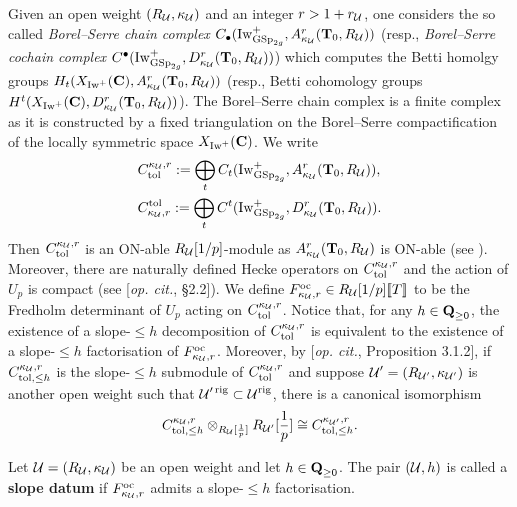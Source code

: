 Given an open weight $(R_{\calU}, \kappa_{\calU})$ and an integer $r>1+r_{\calU}$, one considers the so called \emph{Borel--Serre chain complex} $C_{\bullet}(\Iw_{\GSp_{2g}}^+, A_{\kappa_{\calU}}^{r}(\T_0, R_{\calU}))$ (resp., \emph{Borel--Serre cochain complex} $C^{\bullet}(\Iw_{\GSp_{2g}}^+, D_{\kappa_{\calU}}^{r}(\T_0, R_{\calU}))$) which computes the Betti homolgy groups $H_t(X_{\Iw^+}(\C), A_{\kappa_{\calU}}^r(\T_0, R_{\calU}))$ (resp., Betti cohomology groups $H^t(X_{\Iw^+}(\C), D_{\kappa_{\calU}}^r(\T_0, R_{\calU}))$). The Borel--Serre chain complex is a finite complex as it is constructed by a fixed triangulation on the Borel--Serre compactification of the locally symmetric space $X_{\Iw^+}(\C)$. We write \begin{align*}
    & C_{\tol}^{\kappa_{\calU}, r} := \bigoplus_{t}C_t(\Iw^+_{\GSp_{2g}}, A_{\kappa_{\calU}}^r(\T_0, R_{\calU})),\\
    & C_{\kappa_{\calU}, r}^{\tol} := \bigoplus_{t}C^t(\Iw_{\GSp_{2g}}^+, D_{\kappa_{\calU}}^r(\T_0, R_{\calU})).
\end{align*} Then $C^{\kappa_{\calU}, r}_{\tol}$ is an ON-able $R_{\calU}[1/p]$-module as $A_{\kappa_{\calU}}^r(\T_0, R_{\calU})$ is ON-able (see \cite[\S 2.2, Remarks]{Hansen-PhD}). Moreover, there are naturally defined Hecke operators on $C_{\tol}^{\kappa_{\calU}, r}$ and the action of $U_p$ is compact (see [\textit{op. cit.}, \S 2.2]). We define $F_{\kappa_{\calU}, r}^{\oc}\in R_{\calU}[1/p]\llbrack T\rrbrack$ to be the Fredholm determinant of $U_p$ acting on $C^{\kappa_{\calU}, r}_{\tol}$. Notice that, for any $h\in \Q_{\geq 0}$, the existence of a slope-$\leq h$ decomposition of $C_{\tol}^{\kappa_{\calU}, r}$ is equivalent to the existence of a slope-$\leq h$ factorisation of $F_{\kappa_{\calU},r}^{\oc}$. Moreover, by [\textit{op. cit.}, Proposition 3.1.2], if $C^{\kappa_{\calU},r}_{\tol, \leq h}$ is the slope-$\leq h$ submodule of $C^{\kappa_{\calU},r}_{\tol}$ and suppose $\calU'=(R_{\calU'}, \kappa_{\calU'})$ is another open weight such that $\calU'^{\rig} \subset \calU^{\rig}$, there is a canonical isomorphism \[
    C_{\tol, \leq h}^{\kappa_{\calU}, r}\otimes_{R_{\calU}[\frac{1}{p}]}R_{\calU'}[\frac{1}{p}] \cong C_{\tol, \leq h}^{\kappa_{\calU'}, r}.
\]

\begin{Definition}
Let $\calU=(R_{\calU}, \kappa_{\calU})$ be an open weight and let $h\in \Q_{\geq 0}$. The pair $(\calU, h)$ is called a \textbf{slope datum} if $F_{\kappa_{\calU},r}^{\oc}$ admits a slope-$\leq h$ factorisation.
\end{Definition}

